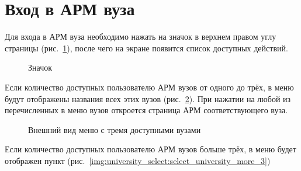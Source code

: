 \section{Вход в АРМ вуза} \label{sec:cabinet}
Для входа в АРМ вуза необходимо нажать на значок  в верхнем правом углу страницы (рис.~\ref{img:university_select:icon}),
после чего на экране появится список доступных действий.

\begin{figure}[H]
	\caption{Значок }
	\label{img:university_select:icon}
\end{figure}
Если количество доступных пользователю АРМ вузов от одного до трёх, в меню будут отображены названия всех этих вузов (рис.~\ref{img:university_select:select_university_less_3}). При нажатии на любой из перечисленных в меню вузов откроется страница АРМ соответствующего вуза.

\begin{figure}[H]
	\caption{Внешний вид меню с тремя доступными вузами}
	\label{img:university_select:select_university_less_3}
\end{figure}

Если количество доступных пользователю АРМ вузов больше трёх, в меню будет отображен пункт  (рис.~\ref{img:university_select:select_university_more_3})

